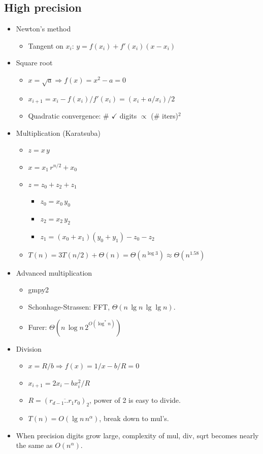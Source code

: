 \documentclass[twocolumn]{article}
\begin{document}
\subsection{High precision}
\begin{itemize}
\item Newton's method
  \begin{itemize}
  \item Tangent on $x_i$: $y = f(x_i) + f'(x_i) (x-x_i)$
  \end{itemize}
\item Square root
  \begin{itemize}
  \item $x = \sqrt{a} \Rightarrow
  f(x) = x^2 - a = 0$
  \item $x_{i+1} = x_i - f(x_i)/f'(x_i) = (x_i + a/x_i) / 2$
  \item Quadratic convergence: \# $\checkmark$ digits $\propto$ (\# iters)$^2$
  \end{itemize}
\item Multiplication (Karatsuba)
  \begin{itemize}
  \item $z = x \, y$
  \item $x = x_1\,r^{n/2} + x_0$
  \item $z = z_0 + z_2 + z_1$
    \begin{itemize}
    \item $z_0 = x_0\,y_0$
    \item $z_2 = x_2\,y_2$
    \item $z_1 = (x_0 + x_1) (y_0 + y_1) - z_0 - z_2$
    \end{itemize}
  \item $T(n) = 3 T(n/2) + \Theta(n) = \Theta(n^{\log 3}) \approx \Theta(n^{1.58})$
  \end{itemize}
\item Advanced multiplication
  \begin{itemize}
  \item gmpy2
  \item Schonhage-Strassen: FFT, $\Theta(n\,\lg n\,\lg\lg n)$.
  \item Furer: $\Theta(n\,\log n\,2^{O(\log^* n)})$
  \end{itemize}
\item Division
  \begin{itemize}
  \item $x = R/b \Rightarrow f(x) = 1/x - b/R = 0$
  \item $x_{i+1} = 2 x_i - b x_i^2 / R$
  \item $R = (\overline{r_{d-1}..r_1r_0})_2$, power of 2 is easy to divide.
   \item $T(n) = O(\lg n\, n^{\alpha})$, break down to mul's.
  \end{itemize}
\item When precision digits grow large, complexity of mul, div, sqrt becomes nearly the same as $O(n^{\alpha})$.
\end{itemize}
\end{document}

